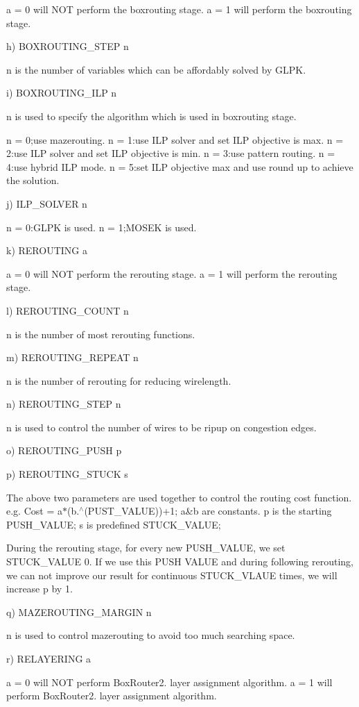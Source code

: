 \begin{DoxyItemize}
a = 0 will N\+OT perform the boxrouting stage. a = 1 will perform the boxrouting stage.
\item h) B\+O\+X\+R\+O\+U\+T\+I\+N\+G\+\_\+\+S\+T\+EP n

n is the number of variables which can be affordably solved by G\+L\+PK.
\item i) B\+O\+X\+R\+O\+U\+T\+I\+N\+G\+\_\+\+I\+LP n

n is used to specify the algorithm which is used in boxrouting stage.

n = 0;use mazerouting. n = 1\+:use I\+LP solver and set I\+LP objective is max. n = 2\+:use I\+LP solver and set I\+LP objective is min. n = 3\+:use pattern routing. n = 4\+:use hybrid I\+LP mode. n = 5\+:set I\+LP objective max and use round up to achieve the solution.
\item j) I\+L\+P\+\_\+\+S\+O\+L\+V\+ER n

n = 0\+:G\+L\+PK is used. n = 1;M\+O\+S\+EK is used.
\item k) R\+E\+R\+O\+U\+T\+I\+NG a

a = 0 will N\+OT perform the rerouting stage. a = 1 will perform the rerouting stage.
\item l) R\+E\+R\+O\+U\+T\+I\+N\+G\+\_\+\+C\+O\+U\+NT n

n is the number of most rerouting functions.
\item m) R\+E\+R\+O\+U\+T\+I\+N\+G\+\_\+\+R\+E\+P\+E\+AT n

n is the number of rerouting for reducing wirelength.
\item n) R\+E\+R\+O\+U\+T\+I\+N\+G\+\_\+\+S\+T\+EP n

n is used to control the number of wires to be ripup on congestion edges.
\item o) R\+E\+R\+O\+U\+T\+I\+N\+G\+\_\+\+P\+U\+SH p
\item p) R\+E\+R\+O\+U\+T\+I\+N\+G\+\_\+\+S\+T\+U\+CK s

The above two parameters are used together to control the routing cost function. e.\+g. Cost = a$\ast$(b.$^\wedge$(P\+U\+S\+T\+\_\+\+V\+A\+L\+UE))+1; a\&b are constants. p is the starting P\+U\+S\+H\+\_\+\+V\+A\+L\+UE; s is predefined S\+T\+U\+C\+K\+\_\+\+V\+A\+L\+UE;

During the rerouting stage, for every new P\+U\+S\+H\+\_\+\+V\+A\+L\+UE, we set S\+T\+U\+C\+K\+\_\+\+V\+A\+L\+UE 0. If we use this P\+U\+SH V\+A\+L\+UE and during following rerouting, we can not improve our result for continuous S\+T\+U\+C\+K\+\_\+\+V\+L\+A\+UE times, we will increase p by 1.
\item q) M\+A\+Z\+E\+R\+O\+U\+T\+I\+N\+G\+\_\+\+M\+A\+R\+G\+IN n

n is used to control mazerouting to avoid too much searching space.
\item r) R\+E\+L\+A\+Y\+E\+R\+I\+NG a

a = 0 will N\+OT perform Box\+Router2. layer assignment algorithm. a = 1 will perform Box\+Router2. layer assignment algorithm.
\end{DoxyItemize}

